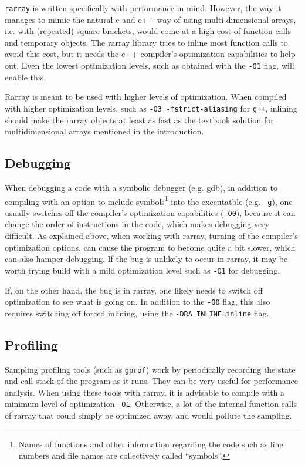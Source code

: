 \documentclass[11pt,twoside]{article}
\begin{document}
\noindent
\texttt{rarray} is written specifically with performance in
mind. However, the way it manages to mimic the natural c and c++ way
of using multi-dimensional arrays, i.e. with (repeated) square
brackets, would come at a high cost of function calls and temporary
objects. The rarray library tries to inline most function calls to avoid this
cost, but it needs the c++ compiler's optimization capabilities to
help out. Even the lowest optimization levels, such as obtained with
the \texttt{-O1} flag, will enable this.

Rarray is meant to be used with higher levels of optimization. When
compiled with higher optimization levels, such as \texttt{-O3
  -fstrict-aliasing} for \texttt{g++}, inlining should make the rarray
objects at least as fast as the textbook solution for multidimensional
arrays mentioned in the introduction.

\subsection{Debugging}

When debugging a code with a symbolic debugger (e.g. gdb), in addition
to compiling with an option to include symbols\footnote{Names of
  functions and other information regarding the code such as line
  numbers and file names are collectively called ``symbols''.} into
the executatble (e.g. \texttt{-g}), one usually switches off the
compiler's optimization capabilities (\texttt{-O0}), because it can
change the order of instructions in the code, which makes debugging
very difficult. As explained above, when working with rarray, turning
of the compiler's optimization options, can cause the program to
become quite a bit slower, which can also hamper debugging.  If the
bug is unlikely to occur in rarray, it may be worth trying build with
a mild optimization level such as \texttt{-O1} for debugging.

If, on the other hand, the bug is in rarray, one likely needs to
switch off optimization to see what is going on.  In addition to the
\texttt{-O0} flag, this also requires switching off forced inlining,
using the \texttt{-DRA\_INLINE=inline} flag.

\subsection{Profiling}

Sampling profiling tools (such as \texttt{gprof}) work by periodically
recording the state and call stack of the program as it runs.  They
can be very useful for performance analysis. When using these tools
with rarray, it is advisable to compile with a minimum level of
optimization \texttt{-O1}. Otherwise, a lot of the internal function
calls of rarray that could simply be optimized away, and would pollute
the sampling. 
\end{document}
